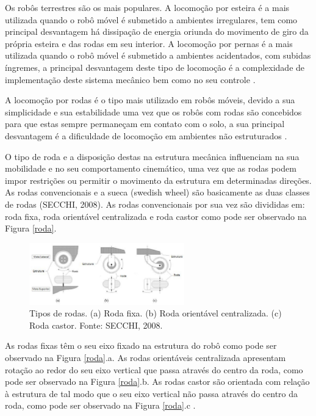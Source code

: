 Os robôs terrestres são os mais populares. A locomoção por esteira é a mais utilizada quando o robô móvel é submetido a ambientes
irregulares, tem como principal desvantagem há dissipação de energia oriunda do movimento de giro da própria esteira e das rodas em seu
interior. A locomoção por pernas é a mais utilizada quando o robô móvel é submetido a ambientes acidentados, com subidas íngremes, a
principal desvantagem deste tipo de locomoção é a complexidade de implementação deste sistema mecânico bem como no seu controle \cite{pieri:2002}.

A locomoção por rodas é o tipo mais utilizado em robôs móveis, devido a sua simplicidade e sua estabilidade uma vez que os robôs com
rodas são concebidos para que estas sempre permaneçam em contato com o solo, a sua principal desvantagem é a dificuldade de locomoção
em ambientes não estruturados \cite{pieri:2002} \cite{siegwart:2002}. 

O tipo de roda e a disposição destas na estrutura mecânica influenciam na sua mobilidade e no seu comportamento cinemático, uma vez
que as rodas podem impor restrições ou permitir o movimento da estrutura em determinadas direções. As rodas convencionais e a sueca
(swedish wheel) são basicamente as duas classes de rodas (SECCHI, 2008). As rodas convencionais por sua vez são divididas em: roda fixa,
roda orientável centralizada e roda castor como pode ser observado na Figura \ref{roda}.

\begin{figure}[H]
    \centering
    \includegraphics[width=0.6\textwidth]{figuras/roda.eps}
    \caption{Tipos de rodas. (a) Roda fixa. (b) Roda orientável centralizada. (c) Roda castor. Fonte: SECCHI, 2008.}
    \label{fig:roda}
\end{figure}

As rodas fixas têm o seu eixo fixado na estrutura do robô como pode ser observado na Figura \ref{roda}.a. As rodas orientáveis centralizada
apresentam rotação ao redor do seu eixo vertical que passa através do centro da roda, como pode ser observado na Figura \ref{roda}.b. As
rodas castor são orientada com relação à estrutura de tal modo que o seu eixo vertical não passa através do centro da roda, como
pode ser observado na Figura \ref{roda}.c \cite{secchi:2008}. 

